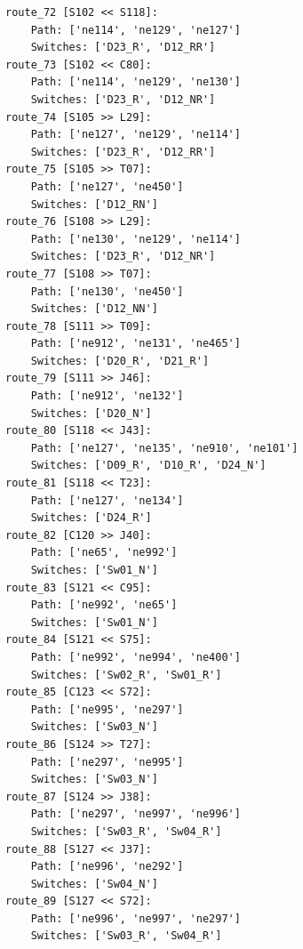 \begin{lstlisting}[language = {}, tabsize=4, basicstyle=\footnotesize\ttfamily, showspaces=false, showstringspaces=false, caption = Routes.RNA, label = {lst:EJ4_7}]
route_72 [S102 << S118]:
	Path: ['ne114', 'ne129', 'ne127']
	Switches: ['D23_R', 'D12_RR']
route_73 [S102 << C80]:
	Path: ['ne114', 'ne129', 'ne130']
	Switches: ['D23_R', 'D12_NR']
route_74 [S105 >> L29]:
	Path: ['ne127', 'ne129', 'ne114']
	Switches: ['D23_R', 'D12_RR']
route_75 [S105 >> T07]:
	Path: ['ne127', 'ne450']
	Switches: ['D12_RN']
route_76 [S108 >> L29]:
	Path: ['ne130', 'ne129', 'ne114']
	Switches: ['D23_R', 'D12_NR']
route_77 [S108 >> T07]:
	Path: ['ne130', 'ne450']
	Switches: ['D12_NN']
route_78 [S111 >> T09]:
	Path: ['ne912', 'ne131', 'ne465']
	Switches: ['D20_R', 'D21_R']
route_79 [S111 >> J46]:
	Path: ['ne912', 'ne132']
	Switches: ['D20_N']
route_80 [S118 << J43]:
	Path: ['ne127', 'ne135', 'ne910', 'ne101']
	Switches: ['D09_R', 'D10_R', 'D24_N']
route_81 [S118 << T23]:
	Path: ['ne127', 'ne134']
	Switches: ['D24_R']
route_82 [C120 >> J40]:
	Path: ['ne65', 'ne992']
	Switches: ['Sw01_N']
route_83 [S121 << C95]:
	Path: ['ne992', 'ne65']
	Switches: ['Sw01_N']
route_84 [S121 << S75]:
	Path: ['ne992', 'ne994', 'ne400']
	Switches: ['Sw02_R', 'Sw01_R']
route_85 [C123 << S72]:
	Path: ['ne995', 'ne297']
	Switches: ['Sw03_N']
route_86 [S124 >> T27]:
	Path: ['ne297', 'ne995']
	Switches: ['Sw03_N']
route_87 [S124 >> J38]:
	Path: ['ne297', 'ne997', 'ne996']
	Switches: ['Sw03_R', 'Sw04_R']
route_88 [S127 << J37]:
	Path: ['ne996', 'ne292']
	Switches: ['Sw04_N']
route_89 [S127 << S72]:
	Path: ['ne996', 'ne997', 'ne297']
	Switches: ['Sw03_R', 'Sw04_R']
	\end{lstlisting}